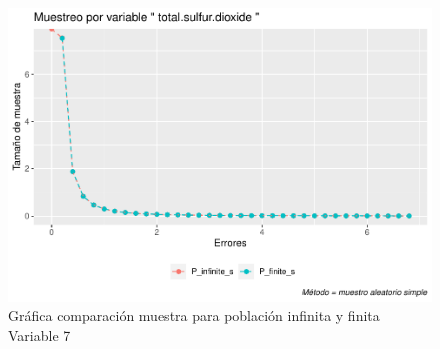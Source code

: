 \documentclass[
]{article}
\begin{document}
\begin{figure}
\centering
\includegraphics{1_examen_solucion_files/figure-latex/grafica va7-1.pdf}
\caption{Gráfica comparación muestra para población infinita y finita
Variable 7}
\end{figure}
\end{document}
